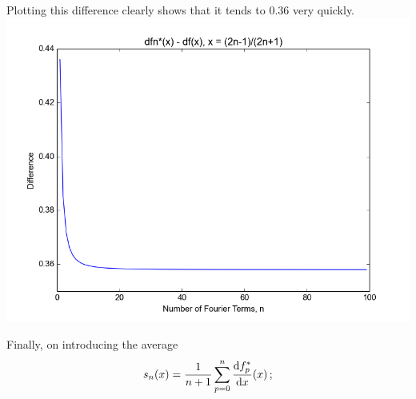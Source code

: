 \documentclass[12pt]{article}
\newcommand{\dfpstardx}{\frac{{\rm d}f_p^*}{{\rm d}x}}
\begin{document}

Plotting this difference clearly shows that it tends to 0.36 very quickly.\\
\hspace{-3em}
\includegraphics[scale=0.75]{tend036.png}

\clearpage
Finally, on introducing the average
\begin{align*}
s_n(x) = \frac{1}{n+1} \sum_{p=0}^n \dfpstardx (x)\,;
\end{align*}
\end{document}
